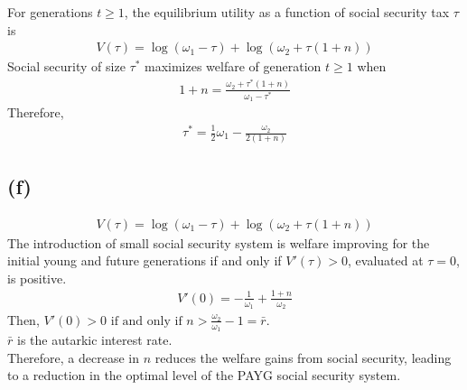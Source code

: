 \documentclass{ltjsarticle}
\begin{document}
For generations $t \geq 1$, the equilibrium utility as a function of social security tax $\tau$ is\\
\begin{align*}
  V(\tau) = \log(\omega_1 - \tau) + \log(\omega_2 + \tau (1 + n))
\end{align*}
Social security of size $\tau^*$ maximizes welfare of generation $t \geq 1$ when\\
\begin{align*}
  1 + n = \frac{\omega_2 + \tau^* (1 + n)}{\omega_1 - \tau^*}
\end{align*}
Therefore,\\
\begin{align*}
  \tau^* = \frac{1}{2}\omega_1 - \frac{\omega_2}{2(1 + n)}
\end{align*}

\subsection*{(f)}
\begin{align*}
  V(\tau) = \log(\omega_1 - \tau) + \log(\omega_2 + \tau (1 + n))
\end{align*}
The introduction of small social security system is welfare improving for the  initial young and future generations if and only if $V\prime (\tau) > 0$, evaluated at $\tau = 0$, is positive.\\
\begin{align*}
  V\prime (0) = -\frac{1}{\omega_1} + \frac{1 + n}{\omega_2}
\end{align*}
Then, $V\prime (0) > 0 \text{ if and only if } n > \frac{\omega_2}{\omega_1} - 1 = \bar{r}$.\\
$\bar{r}$ is the autarkic interest rate.\\
Therefore, a decrease in $n$ reduces the welfare gains from social security, leading to a reduction in the optimal level of the PAYG social security system.

\section{} %
\end{document}
